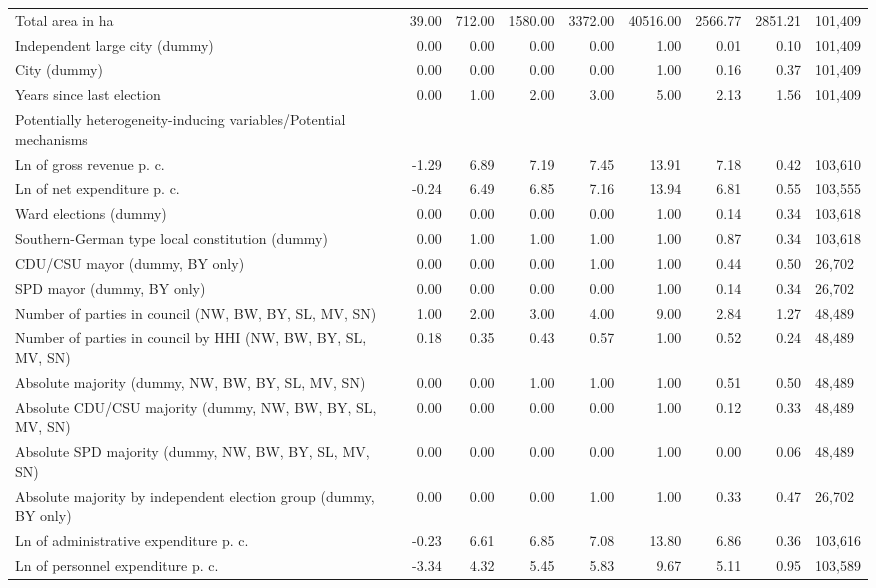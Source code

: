 \begin{tabular}{lrrrrrrrl}
  Total area in ha & 39.00 & 712.00 & 1580.00 & 3372.00 & 40516.00 & 2566.77 & 2851.21 & 101,409 \\ 
  Independent large city (dummy) & 0.00 & 0.00 & 0.00 & 0.00 & 1.00 & 0.01 & 0.10 & 101,409 \\ 
  City (dummy) & 0.00 & 0.00 & 0.00 & 0.00 & 1.00 & 0.16 & 0.37 & 101,409 \\ 
  Years since last election & 0.00 & 1.00 & 2.00 & 3.00 & 5.00 & 2.13 & 1.56 & 101,409 \\ 
  Potentially heterogeneity-inducing variables/Potential mechanisms &  &  &  &  &  &  &  &  \\ 
  Ln of gross revenue p. c. & -1.29 & 6.89 & 7.19 & 7.45 & 13.91 & 7.18 & 0.42 & 103,610 \\ 
  Ln of net expenditure p. c. & -0.24 & 6.49 & 6.85 & 7.16 & 13.94 & 6.81 & 0.55 & 103,555 \\ 
  Ward elections (dummy) & 0.00 & 0.00 & 0.00 & 0.00 & 1.00 & 0.14 & 0.34 & 103,618 \\ 
  Southern-German type local constitution (dummy) & 0.00 & 1.00 & 1.00 & 1.00 & 1.00 & 0.87 & 0.34 & 103,618 \\ 
  CDU/CSU mayor (dummy, BY only) & 0.00 & 0.00 & 0.00 & 1.00 & 1.00 & 0.44 & 0.50 & 26,702 \\ 
  SPD mayor (dummy, BY only) & 0.00 & 0.00 & 0.00 & 0.00 & 1.00 & 0.14 & 0.34 & 26,702 \\ 
  Number of parties in council (NW, BW, BY, SL, MV, SN) & 1.00 & 2.00 & 3.00 & 4.00 & 9.00 & 2.84 & 1.27 & 48,489 \\ 
  Number of parties in council by HHI (NW, BW, BY, SL, MV, SN) & 0.18 & 0.35 & 0.43 & 0.57 & 1.00 & 0.52 & 0.24 & 48,489 \\ 
  Absolute majority (dummy, NW, BW, BY, SL, MV, SN) & 0.00 & 0.00 & 1.00 & 1.00 & 1.00 & 0.51 & 0.50 & 48,489 \\ 
  Absolute CDU/CSU majority (dummy, NW, BW, BY, SL, MV, SN) & 0.00 & 0.00 & 0.00 & 0.00 & 1.00 & 0.12 & 0.33 & 48,489 \\ 
  Absolute SPD majority (dummy, NW, BW, BY, SL, MV, SN) & 0.00 & 0.00 & 0.00 & 0.00 & 1.00 & 0.00 & 0.06 & 48,489 \\ 
  Absolute majority by independent election group (dummy, BY only) & 0.00 & 0.00 & 0.00 & 1.00 & 1.00 & 0.33 & 0.47 & 26,702 \\ 
  Ln of administrative expenditure p. c. & -0.23 & 6.61 & 6.85 & 7.08 & 13.80 & 6.86 & 0.36 & 103,616 \\ 
  Ln of personnel expenditure p. c. & -3.34 & 4.32 & 5.45 & 5.83 & 9.67 & 5.11 & 0.95 & 103,589 \\ 

\end{tabular}
